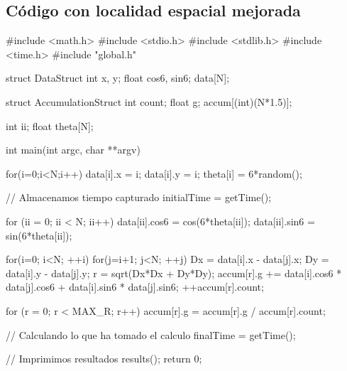 \subsection{C\'odigo con localidad espacial mejorada}
\begin{verbatimtab}
#include <math.h>
#include <stdio.h>
#include <stdlib.h>
#include <time.h>
#include "global.h"

struct DataStruct
{
	int x, y;
	float cos6, sin6;
} data[N];

struct AccumulationStruct
{
	int count;
	float g;
} accum[(int)(N*1.5)];

int ii;
float theta[N];

int main(int argc, char **argv)
{
	for(i=0;i<N;i++)
	{
		data[i].x = i;
		data[i].y = i;
		theta[i] = 6*random();
	}


	//	Almacenamos tiempo capturado
	initialTime = getTime();

	for (ii = 0; ii < N; ii++)
	{
		data[ii].cos6 = cos(6*theta[ii]);
		data[ii].sin6 = sin(6*theta[ii]);
	}
	
	for(i=0; i<N; ++i)	
		for(j=i+1; j<N; ++j)
		{
			Dx = data[i].x - data[j].x;
			Dy = data[i].y - data[j].y;
			r = sqrt(Dx*Dx + Dy*Dy);
			accum[r].g += data[i].cos6 * data[j].cos6 + data[i].sin6 * data[j].sin6;
			++accum[r].count;
		}

	for (r = 0; r < MAX_R; r++)
		accum[r].g = accum[r].g / accum[r].count;

	//	Calculando lo que ha tomado el calculo
	finalTime = getTime();
	
	//	Imprimimos resultados
	results();
	return 0;
}
\end{verbatimtab}

